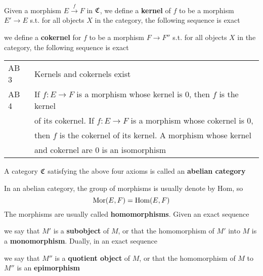 \documentclass[11pt]{article}
\def \Mor {\text{Mor}}
\begin{document}
Given a morphism \(E\xrightarrow{f}F\) in \(\mathfrak{C}\), we define a \textbf{kernel} of \(f\) to be a morphism \(E'\to E\) s.t.
for all objects \(X\) in the category, the following sequence is exact
\begin{center}\end{center}
we define a \textbf{cokernel} for \(f\) to be a morphism \(F\to F''\) s.t. for all objects \(X\) in the
category, the following sequence is exact
\begin{center}\end{center}
\begin{center}
\begin{tabular}{ll}
AB 3 & Kernels and cokernels exist\\
AB 4 & If \(f:E\to F\) is a morphism whose kernel is 0, then \(f\) is the kernel\\
 & of its cokernel. If \(f:E\to F\) is a morphism whose cokernel is 0,\\
 & then \(f\) is the cokernel of its kernel. A morphism whose kernel\\
 & and cokernel are 0 is an isomorphism\\
\end{tabular}
\end{center}


A category \(\mathfrak{C}\) satisfying the above four axioms is called an \textbf{abelian category}

In an abelian category, the group of morphisms is usually denote by Hom, so
\begin{equation*}
\Mor(E,F)=\Hom(E,F)
\end{equation*}
The morphisms are usually called \textbf{homomorphisms}. Given an exact sequence
\begin{center}\end{center}
we say that \(M'\) is a \textbf{subobject} of \(M\), or that the homomorphism of \(M'\) into \(M\) is a
\textbf{monomorphism}. Dually, in an exact sequence
\begin{center}\end{center}
we say that \(M''\) is a \textbf{quotient object} of \(M\), or that the homomorphism of \(M\) to \(M''\)
is an \textbf{epimorphism}
\end{document}
